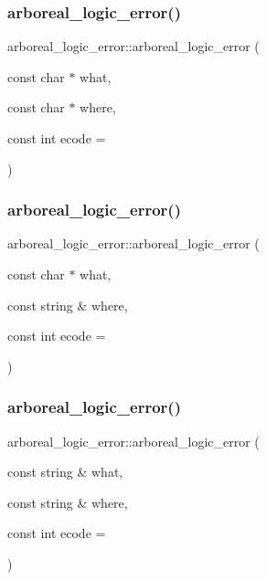 \subsubsection{\texorpdfstring{arboreal\+\_\+logic\+\_\+error()}{arboreal\_logic\_error()}\hspace{0.1cm}{\footnotesize\ttfamily [1/4]}}
{\footnotesize\ttfamily arboreal\+\_\+logic\+\_\+error\+::arboreal\+\_\+logic\+\_\+error (\begin{DoxyParamCaption}\item[{const char $\ast$}]{what,  }\item[{const char $\ast$}]{where,  }\item[{const int}]{ecode = {} }\end{DoxyParamCaption})}

\mbox{\label{classarboreal__logic__error_a70b8217c9841efc9bb1e556282a89fe0}} 
\subsubsection{\texorpdfstring{arboreal\+\_\+logic\+\_\+error()}{arboreal\_logic\_error()}\hspace{0.1cm}{\footnotesize\ttfamily [2/4]}}
{\footnotesize\ttfamily arboreal\+\_\+logic\+\_\+error\+::arboreal\+\_\+logic\+\_\+error (\begin{DoxyParamCaption}\item[{const char $\ast$}]{what,  }\item[{const string \&}]{where,  }\item[{const int}]{ecode = {} }\end{DoxyParamCaption})}

\mbox{\label{classarboreal__logic__error_ad7627c19a966b137cf018aa7c3075421}} 
\subsubsection{\texorpdfstring{arboreal\+\_\+logic\+\_\+error()}{arboreal\_logic\_error()}\hspace{0.1cm}{\footnotesize\ttfamily [3/4]}}
{\footnotesize\ttfamily arboreal\+\_\+logic\+\_\+error\+::arboreal\+\_\+logic\+\_\+error (\begin{DoxyParamCaption}\item[{const string \&}]{what,  }\item[{const string \&}]{where,  }\item[{const int}]{ecode = {} }\end{DoxyParamCaption})}

